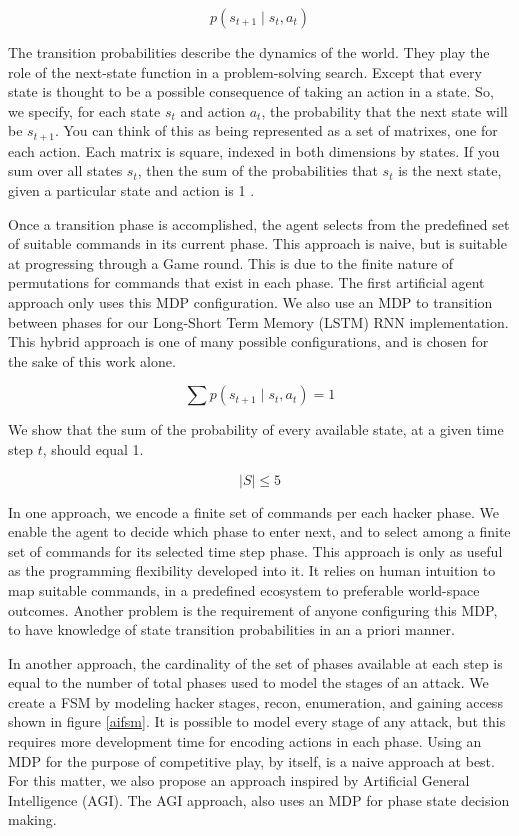 \documentclass[10pt, titlepage, twocolumn]{article}
\begin{document}
\begin{equation}
	 p(s_{t+1} \mid s_t, a_t) 
\end{equation}

The transition probabilities describe the dynamics of the world. They play the role of the next-state function in a problem-solving search. Except that every state is thought to be a possible consequence of taking an action in a state. So, we specify, for each state \(s_t\) and action \(a_t\), the probability that the next state will be \(s_{t+1}\). You can think of this as being represented as a set of matrixes, one for each action. Each matrix is square, indexed in both dimensions by states. If you sum over all states \(s_t\), then the sum of the probabilities that \(s_t\) is the next state, given a particular state and action is 1 \cite{mdp}.

Once a transition phase is accomplished, the agent selects from the predefined set of suitable commands in its current phase. This approach is naive, but is suitable at progressing through a Game round. This is due to the finite nature of permutations for commands that exist in each phase. The first artificial agent approach only uses this MDP configuration. We also use an MDP to transition between phases for our Long-Short Term Memory (LSTM) RNN implementation. This hybrid approach is one of many possible configurations, and is chosen for the sake of this work alone.

\begin{equation}
	\sum p(s_{t+1} \mid s_t, a_t ) = 1
\end{equation}


We show that the sum of the probability of every available state, at a given time step \(t\), should equal 1.

\begin{equation}
	|S| \leq 5
\end{equation}

In one approach, we encode a finite set of commands per each hacker phase. We enable the agent to decide which phase to enter next, and to select among a finite set of commands for its selected time step phase. This approach is only as useful as the programming flexibility developed into it. It relies on human intuition to map suitable commands, in a predefined ecosystem to preferable world-space outcomes. Another problem is the requirement of anyone configuring this MDP, to have knowledge of state transition probabilities in an a priori manner.

In another approach, the cardinality of the set of phases available at each step is equal to the number of total phases used to model the stages of an attack. We create a FSM by modeling hacker stages, recon, enumeration, and gaining access shown in figure \ref{aifsm}. It is possible to model every stage of any attack, but this requires more development time for encoding actions in each phase. Using an MDP for the purpose of competitive play, by itself, is a naive approach at best. For this matter, we also propose an approach inspired by Artificial General Intelligence (AGI). The AGI approach, also uses an MDP for phase state decision making.
\end{document}
